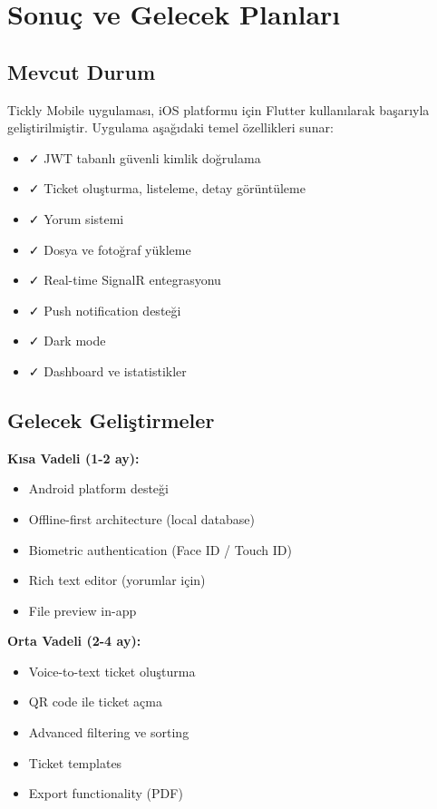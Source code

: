 \documentclass[12pt,a4paper]{article}
\begin{document}
\newpage

\section{Sonuç ve Gelecek Planları}

\subsection{Mevcut Durum}

Tickly Mobile uygulaması, iOS platformu için Flutter kullanılarak başarıyla geliştirilmiştir. Uygulama aşağıdaki temel özellikleri sunar:

\begin{itemize}
    \item ✓ JWT tabanlı güvenli kimlik doğrulama
    \item ✓ Ticket oluşturma, listeleme, detay görüntüleme
    \item ✓ Yorum sistemi
    \item ✓ Dosya ve fotoğraf yükleme
    \item ✓ Real-time SignalR entegrasyonu
    \item ✓ Push notification desteği
    \item ✓ Dark mode
    \item ✓ Dashboard ve istatistikler
\end{itemize}

\subsection{Gelecek Geliştirmeler}

\textbf{Kısa Vadeli (1-2 ay):}
\begin{itemize}
    \item Android platform desteği
    \item Offline-first architecture (local database)
    \item Biometric authentication (Face ID / Touch ID)
    \item Rich text editor (yorumlar için)
    \item File preview in-app
\end{itemize}

\textbf{Orta Vadeli (2-4 ay):}
\begin{itemize}
    \item Voice-to-text ticket oluşturma
    \item QR code ile ticket açma
    \item Advanced filtering ve sorting
    \item Ticket templates
    \item Export functionality (PDF)
\end{itemize}
\end{document}
